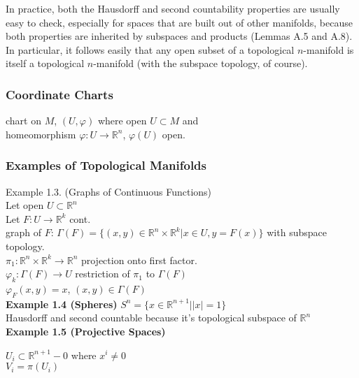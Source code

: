 \hrulefill

In practice, both the Hausdorff and second countability properties are usually easy to check, especially for spaces that are built out of other manifolds, because both properties are inherited by subspaces and products (Lemmas A.5 and A.8).  In particular, it follows easily that any open subset of a topological $n$-manifold is itself a topological $n$-manifold (with the subspace topology, of course).  

\subsubsection*{Coordinate Charts}

chart on $M$, $(U, \varphi)$ where open $U \subset M$ and \\
homeomorphism $\varphi : U \to \mathbb{R}^n$, $\varphi(U)$ open.  






\subsubsection*{Examples of Topological Manifolds}

Example 1.3. (Graphs of Continuous Functions) \\
Let open $U \subset \mathbb{R}^n$ \\
Let $F: U \to \mathbb{R}^k$ cont. \\
graph of $F$: $\Gamma(F) = \lbrace (x,y) \in \mathbb{R}^n \times \mathbb{R}^k | x \in U , y = F(x) \rbrace$ with subspace topology. \\
$\pi_1 : \mathbb{R}^n \times \mathbb{R}^k \to \mathbb{R}^n$ projection onto first factor. \\
$\varphi_k:\Gamma(F) \to U$ restriction of $\pi_1$ to $\Gamma(F)$ \\
$\varphi_F(x,y) = x$, $(x,y) \in \Gamma(F)$ \\

\textbf{Example 1.4 (Spheres)} $S^n = \lbrace x \in \mathbb{R}^{n+1} | |x| = 1 \rbrace$ \\
Hausdorff and second countable because it's topological subspace of $\mathbb{R}^n$   \\


\textbf{Example 1.5 (Projective Spaces)}

$U_i \subset \mathbb{R}^{n+1} - 0$ where $x^i \neq 0$  \\
$V_i = \pi(U_i)$  


